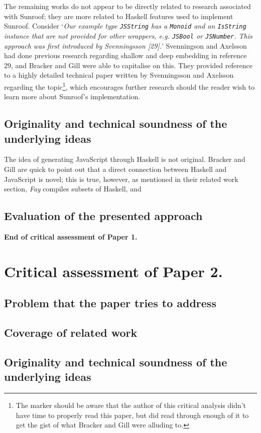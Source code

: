 \documentclass[9pt, twocolumn]{article}
\begin{document}
The remaining works do not appear to be directly related to research associated with Sunroof; they are more related to Haskell features used to implement Sunroof.
Consider `{\it Our example type \verb/JSString/ has a \verb/Monoid/ and an \verb/IsString/ instance that are not provided for other wrappers, e.g. \verb/JSBool/ or \verb/JSNumber/. This approach was first introduced by Svenningsson [29].}'
Svenningson and Axelsson had done previous research regarding shallow and deep embedding in reference 29, and Bracker and Gill were able to capitalise on this. They provided reference to a highly detailed technical paper written by Svenningsson and Axelsson regarding the topic\footnote{The marker should be aware that the author of this critical analysis didn't have time to properly read this paper, but did read through enough of it to get the gist of what Bracker and Gill were alluding to.}, which encourages further research should the reader wish to learn more about Sunroof's implementation.

\subsection*{Originality and technical soundness of the underlying ideas}
The idea of generating JavaScript through Haskell is not original.
Bracker and Gill are quick to point out that a direct connection between Haskell and JavaScript is novel; this is true, however, as mentioned in their related work section, {\it Fay} compiles subsets of Haskell, and {\it }

\subsection*{Evaluation of the presented approach}

\noindent
{\bf End of critical assessment of Paper 1.}
\clearpage
\section*{Critical assessment of Paper 2.}
\subsection*{Problem that the paper tries to address}
\subsection*{Coverage of related work}
\subsection*{Originality and technical soundness of the underlying ideas}
\end{document}
